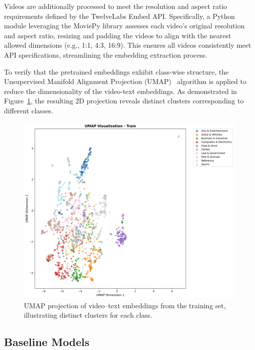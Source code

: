
Videos are additionally processed to meet the resolution and aspect ratio requirements defined by the TwelveLabs Embed API.
Specifically, a Python module leveraging the MoviePy library assesses each video's original resolution and aspect ratio, resizing and padding the videos to align with the nearest allowed dimensions (e.g., 1:1, 4:3, 16:9).
This ensures all videos consistently meet API specifications, streamlining the embedding extraction process.

To verify that the pretrained embeddings exhibit class-wise structure, the Unsupervised Manifold Alignment Projection (UMAP)~\cite{mcinnes2018umap} algorithm is applied to reduce the dimensionality of the video-text embeddings.
As demonstrated in Figure~\ref{fig:umap}, the resulting 2D projection reveals distinct clusters corresponding to different classes.

\begin{figure}[h]
\centering
\includegraphics[width=0.8\linewidth]{asset/umap_train.png}
\caption{UMAP projection of video–text embeddings from the training set, illustrating distinct clusters for each class.}
\label{fig:umap}
\end{figure}

\subsection{Baseline Models}

